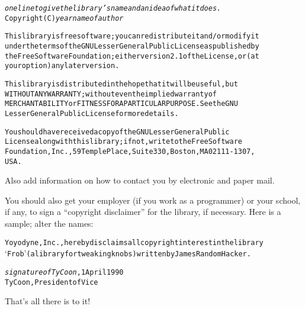\begin{alltt}
\emph{one line to give the library's name and an idea of what it does.}
Copyright (C) \emph{year}  \emph{name of author}

This library is free software; you can redistribute it and/or modify it
under the terms of the GNU Lesser General Public License as published by
the Free Software Foundation; either version 2.1 of the License, or (at
your option) any later version.

This library is distributed in the hope that it will be useful, but
WITHOUT ANY WARRANTY; without even the implied warranty of
MERCHANTABILITY or FITNESS FOR A PARTICULAR PURPOSE.  See the GNU
Lesser General Public License for more details.

You should have received a copy of the GNU Lesser General Public
License along with this library; if not, write to the Free Software
Foundation, Inc., 59 Temple Place, Suite 330, Boston, MA 02111-1307,
USA.
\end{alltt}

Also add information on how to contact you by electronic and paper mail.

You should also get your employer (if you work as a programmer) or your
school, if any, to sign a ``copyright disclaimer'' for the library, if
necessary.  Here is a sample; alter the names:

\begin{alltt}
Yoyodyne, Inc., hereby disclaims all copyright interest in the library
`Frob' (a library for tweaking knobs) written by James Random Hacker.

\emph{signature of Ty Coon}, 1 April 1990
Ty Coon, President of Vice
\end{alltt}

That's all there is to it!
